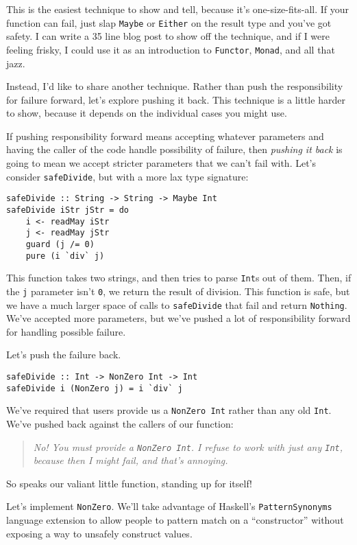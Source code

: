 This is the easiest technique to show and tell, because it's one-size-fits-all. If your function can fail, just slap \texttt{Maybe} or \texttt{Either} on the result type and you've got safety. I can write a 35 line blog post to show off the technique, and if I were feeling frisky, I could use it as an introduction to \texttt{Functor}, \texttt{Monad}, and all that jazz.

Instead, I'd like to share another technique. Rather than push the responsibility for failure forward, let's explore pushing it back. This technique is a little harder to show, because it depends on the individual cases you might use.

If pushing responsibility forward means accepting whatever parameters and having the caller of the code handle possibility of failure, then \textit{pushing it back} is going to mean we accept stricter parameters that we can't fail with. Let's consider \texttt{safeDivide}, but with a more lax type signature:


\begin{verbatim}
safeDivide :: String -> String -> Maybe Int
safeDivide iStr jStr = do
    i <- readMay iStr
    j <- readMay jStr
    guard (j /= 0)
    pure (i `div` j)
\end{verbatim}
This function takes two strings, and then tries to parse \texttt{Int}s out of them. Then, if the \texttt{j} parameter isn't \texttt{0}, we return the result of division. This function is safe, but we have a much larger space of calls to \texttt{safeDivide} that fail and return \texttt{Nothing}. We've accepted more parameters, but we've pushed a lot of responsibility forward for handling possible failure.

Let's push the failure back.
\begin{verbatim}
safeDivide :: Int -> NonZero Int -> Int
safeDivide i (NonZero j) = i `div` j
\end{verbatim}
We've required that users provide us a \texttt{NonZero Int} rather than any old \texttt{Int}. We've pushed back against the callers of our function:
\begin{quotation}
\noindent \textit{No! You must provide a \texttt{NonZero Int}. I refuse to work with just any \texttt{Int}, because then I might fail, and that's annoying.} 
\end{quotation} 
So speaks our valiant little function, standing up for itself!

Let's implement \texttt{NonZero}. We'll take advantage of Haskell's \texttt{PatternSynonyms} language extension to allow people to pattern match on a ``constructor'' without exposing a way to unsafely construct values.

